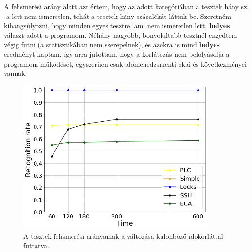 A felismerési arány alatt azt értem, hogy az adott kategóriában a tesztek hány sz. -a lett nem ismeretlen, tehát a tesztek hány százalékát láttuk be. Szeretném kihangsúlyozni, hogy minden egyes tesztre, ami nem ismeretlen lett, \textbf{helyes} választ adott a programom. Néhány nagyobb, bonyolultabb tesztnél engedtem végig futni (a statisztikában nem szerepelnek), és azokra is mind \textbf{helyes} eredményt kaptam, így arra jutottam, hogy a korlátozás nem befolyásolja a programom működését, egyszerűen csak időmenedzsmenti okai és következményei vannak.
\\
\begin{figure}[!ht]
	\centering
	\includegraphics[width=100mm, keepaspectratio]{figures/fig_rec_rate_during_time.png}
	\caption[Caption for LOF]{A tesztek felismerési arányainak a változása különböző időkorláttal futtatva.}
	\label{fig:mivaaaa_geccasui}
\end{figure}

\clearpage

